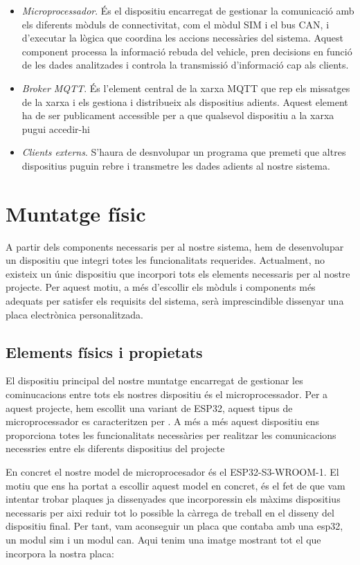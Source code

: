 \documentclass{tfgitic}[2024/07/01]
\begin{document}
\begin{itemize}
  \item \emph{Microprocessador}. És el dispositiu encarregat de gestionar la comunicació amb els diferents mòduls de connectivitat, com el mòdul SIM i el bus CAN, i 
  d'executar la lògica que coordina les accions necessàries del sistema. Aquest component processa la informació rebuda del vehicle, pren decisions en funció 
  de les dades analitzades i controla la transmissió d'informació cap als clients.
  \item \emph{Broker MQTT}. És l’element central de la xarxa MQTT que rep els missatges de la xarxa i els gestiona i distribueix als dispositius adients. Aquest element 
  ha de ser publicament accessible per a que qualsevol dispositiu a la xarxa pugui accedir-hi
  \item \emph{Clients externs}. S’haura de desnvolupar un programa que premeti que altres dispositius puguin rebre i transmetre les dades adients al nostre sistema.
  \end{itemize}

\chapter{Muntatge físic}

A partir dels components necessaris per al nostre sistema, hem de desenvolupar un dispositiu que integri totes les funcionalitats requerides. Actualment, 
no existeix un únic dispositiu que incorpori tots els elements necessaris per al nostre projecte. Per aquest motiu, a més d’escollir els mòduls i components 
més adequats per satisfer els requisits del sistema, serà imprescindible dissenyar una placa electrònica personalitzada.

\section{Elements físics i propietats}

El dispositiu principal del nostre muntatge encarregat de gestionar les cominucacions entre tots els nostres dispositiu és el microprocessador. Per a aquest projecte, 
hem escollit una variant de ESP32, aquest tipus de microprocessador es caracteritzen per  . A més a més aquest dispositiu ens proporciona totes les funcionalitats 
necessàries per realitzar les comunicacions necessries entre els diferents dispositius del projecte

En concret el nostre model de microprocesador és el ESP32-S3-WROOM-1. El motiu que ens ha portat a escollir aquest model en concret, és el fet de que vam intentar 
trobar plaques ja dissenyades que incorporessin els màxims dispositius necessaris per aixi reduir tot lo possible la càrrega de treball en el disseny del dispositiu 
final. Per tant, vam aconseguir un placa que contaba amb una esp32, un modul sim i un modul can. Aqui tenim una imatge mostrant tot el que incorpora la nostra placa:
\end{document}
